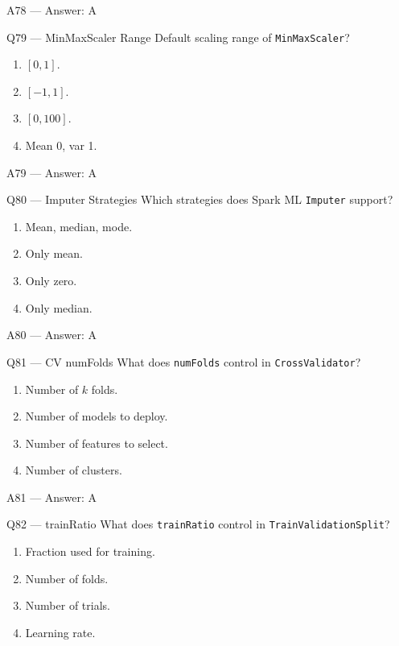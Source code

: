 \documentclass[aspectratio=169,10pt]{beamer}
\begin{document}
	\begin{frame}{A78 — Answer: A}
	\end{frame}
	
	\begin{frame}{Q79 — MinMaxScaler Range}
		Default scaling range of \texttt{MinMaxScaler}?
		\begin{enumerate}[label=\Alph*.]
			\item $[0,1]$.
			\item $[-1,1]$.
			\item $[0,100]$.
			\item Mean 0, var 1.
		\end{enumerate}
	\end{frame}
	
	\begin{frame}{A79 — Answer: A}
	\end{frame}
	
	\begin{frame}{Q80 — Imputer Strategies}
		Which strategies does Spark ML \texttt{Imputer} support?
		\begin{enumerate}[label=\Alph*.]
			\item Mean, median, mode.
			\item Only mean.
			\item Only zero.
			\item Only median.
		\end{enumerate}
	\end{frame}
	
	\begin{frame}{A80 — Answer: A}
	\end{frame}
	
	\begin{frame}{Q81 — CV numFolds}
		What does \texttt{numFolds} control in \texttt{CrossValidator}?
		\begin{enumerate}[label=\Alph*.]
			\item Number of $k$ folds.
			\item Number of models to deploy.
			\item Number of features to select.
			\item Number of clusters.
		\end{enumerate}
	\end{frame}
	
	\begin{frame}{A81 — Answer: A}
	\end{frame}
	
	\begin{frame}{Q82 — trainRatio}
		What does \texttt{trainRatio} control in \texttt{TrainValidationSplit}?
		\begin{enumerate}[label=\Alph*.]
			\item Fraction used for training.
			\item Number of folds.
			\item Number of trials.
			\item Learning rate.
		\end{enumerate}
	\end{frame}
	
\end{document}

